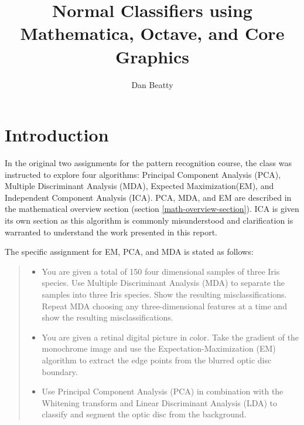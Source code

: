 \documentclass[11pt]{article}
\title{Normal Classifiers using Mathematica, Octave, and Core Graphics}
\author{Dan Beatty}
\begin{document}
\maketitle

\section{Introduction}
In the original two assignments for the pattern recognition course, the class was instructed to explore four algorithms: Principal Component Analysis (PCA), Multiple Discriminant Analysis (MDA), Expected Maximization(EM), and Independent Component Analysis (ICA).  PCA, MDA, and EM  are described in the mathematical overview section (section \ref{math-overview-section}).  ICA is given its own section as this algorithm is commonly misunderstood and clarification is warranted to understand the work presented in this report.  

The specific assignment for EM, PCA, and MDA is stated as follows:
\begin{quote}
\begin{itemize}

	\item You are given a total of 150 four dimensional samples of three Iris species.  Use Multiple Discriminant Analysis (MDA) to separate the samples into three Iris species. Show the resulting misclassifications.   Repeat MDA choosing any three-dimensional features at a time and show the resulting misclassifications.

	\item You are given a retinal digital picture in color.  Take the gradient of the monochrome image and use the Expectation-Maximization (EM) algorithm to extract the edge points from the blurred optic disc boundary.

	\item Use Principal Component Analysis (PCA) in combination with the Whitening transform and Linear Discriminant Analysis (LDA) to classify and segment the optic disc from the background.	

\end{itemize}
\end{quote} 
\end{document}

